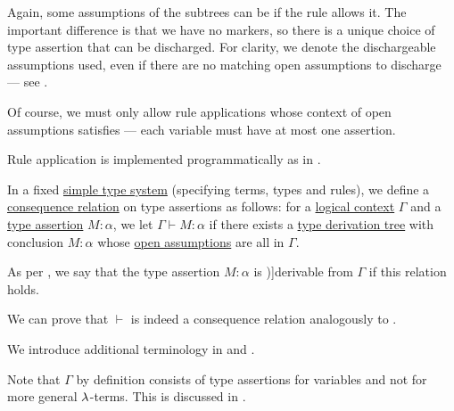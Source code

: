 \begin{definition}
\begin{thmenum}[resume=def:type_derivation_tree]
    Again, some assumptions of the subtrees can be  if the rule allows it. The important difference is that we have no markers, so there is a unique choice of type assertion that can be discharged. For clarity, we denote the dischargeable assumptions used, even if there are no matching open assumptions to discharge --- see .

    Of course, we must only allow rule applications whose context of open assumptions satisfies  --- each variable must have at most one assertion.
  \end{thmenum}
\end{definition}
\begin{comments}
  \item Rule application is implemented programmatically as  in \cite{notebook:code}.
\end{comments}

\begin{definition}\label{def:simple_type_derivability}\mimprovised
  In a fixed \hyperref[def:simple_type_system]{simple type system} (specifying terms, types and rules), we define a \hyperref[def:consequence_relation]{consequence relation} on type assertions as follows: for a \hyperref[def:logical_context]{logical context} \( \Gamma \) and a \hyperref[def:type_assertion]{type assertion} \( M: \alpha \), we let \( \Gamma \vdash M: \alpha \) if there exists a \hyperref[def:type_derivation_tree]{type derivation tree} with conclusion \( M: \alpha \) whose \hyperref[def:natural_deduction_proof_tree/context]{open assumptions} are all in \( \Gamma \).

  As per , we say that the type assertion \( M: \alpha \) is \term[en=derivable (\cite[def. 3.1.4]{Barendregt1992Types})]{derivable} from \( \Gamma \) if this relation holds.
\end{definition}
\begin{comments}
  \item We can prove that \( {\vdash} \) is indeed a consequence relation analogously to .

  \item We introduce additional terminology in  and .

  \item Note that \( \Gamma \) by definition consists of type assertions for variables and not for more general \( \mathrm{\lambda} \)-terms. This is discussed in .
\end{comments}

